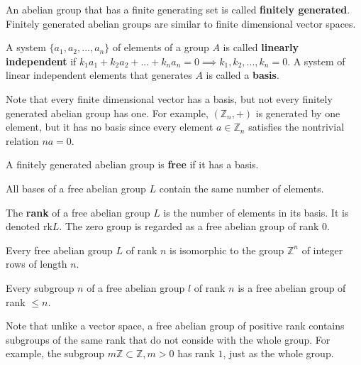 \documentclass{article}
\begin{document}
  \begin{definition}
    An abelian group that has a finite generating set is called \textbf{finitely generated}. Finitely generated abelian groups are similar to finite dimensional vector spaces. 
  \end{definition}

  \begin{definition}
    A system $\{ a_1, a_2, ..., a_n\}$ of elements of a group $A$ is called \textbf{linearly independent} if $k_1 a_1 + k_2 a_2 + ... + k_n a_n = 0 \implies k_1, k_2, ..., k_n = 0$. A system of linear independent elements that generates $A$ is called a \textbf{basis}. 
  \end{definition}

  Note that every finite dimensional vector has a basis, but not every finitely generated abelian group has one. For example, $(\mathbb{Z}_n, +)$ is generated by one element, but it has no basis since every element $a \in \mathbb{Z}_n$ satisfies the nontrivial relation $n a = 0$. 

  \begin{definition}
    A finitely generated abelian group is \textbf{free} if it has a basis. 
  \end{definition}

  \begin{theorem}
    All bases of a free abelian group $L$ contain the same number of elements. 
  \end{theorem}

  \begin{definition}
    The \textbf{rank} of a free abelian group $L$ is the number of elements in its basis. It is denoted rk$L$. The zero group is regarded as a free abelian group of rank $0$. 
  \end{definition}

  \begin{theorem}
    Every free abelian group $L$ of rank $n$ is isomorphic to the group $\mathbb{Z}^n$ of integer rows of length $n$. 
  \end{theorem}

  \begin{theorem}
    Every subgroup $n$ of a free abelian group $l$ of rank $n$ is a free abelian group of rank $ \leq n$. 
  \end{theorem}

  Note that unlike a vector space, a free abelian group of positive rank contains subgroups of the same rank that do not conside with the whole group. For example, the subgroup $m \mathbb{Z} \subset \mathbb{Z}, m > 0$ has rank $1$, just as the whole group. 
\end{document}
